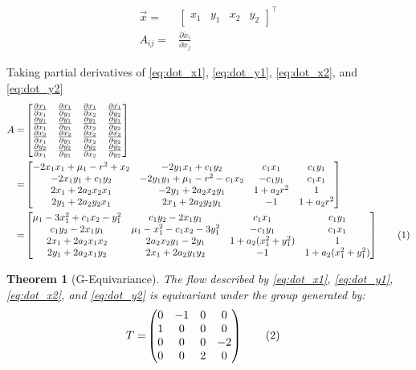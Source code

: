 \documentclass[]{article}
\newcommand\numberthis{\addtocounter{equation}{1}\tag{\theequation}}
\newtheorem{thm}{Theorem}
\begin{document}
\begin{align*}
	\vec{x}=& \begin{bmatrix}
		x_1&y_1&x_2&y_2
	\end{bmatrix}^\top\\
	A_{ij} =&\frac{\partial \dot{x}_i}{\partial x_j}
\end{align*}

Taking partial derivatives of \eqref{eq:dot_x1}, \eqref{eq:dot_y1}, \eqref{eq:dot_x2}, and \eqref{eq:dot_y2}
\begin{align*}
	A =& \begin{bmatrix}
		\frac{\partial \dot{x_1}}{\partial {x_1}}&\frac{\partial \dot{x_1}}{\partial {y_1}}&\frac{\partial \dot{x_1}}{\partial {x_2}}&\frac{\partial \dot{x_1}}{\partial {y_2}}\\
		\frac{\partial \dot{y_1}}{\partial {x_1}}&\frac{\partial \dot{y_1}}{\partial {y_1}}&\frac{\partial \dot{y_1}}{\partial {x_2}}&\frac{\partial \dot{y_1}}{\partial {y_2}}\\
		\frac{\partial \dot{x_2}}{\partial {x_1}}&\frac{\partial \dot{x_2}}{\partial {y_1}}&\frac{\partial \dot{x_2}}{\partial {x_2}}&\frac{\partial \dot{x_2}}{\partial {y_2}}\\
		\frac{\partial \dot{y_2}}{\partial {x_1}}&\frac{\partial \dot{y_2}}{\partial {y_1}}&\frac{\partial \dot{y_2}}{\partial {x_2}}&\frac{\partial \dot{y_2}}{\partial {y_2}}
	\end{bmatrix}\\
	=& \begin{bmatrix}
		-2x_1x_1 + \mu_1-r^2+x_2&-2y_1x_1+c_1y_2&c_1x_1&c_1y_1\\
		-2 x_1y_1 +c_1 y_2&-2y_1y_1+\mu_1-r^2-c_1x_2&-c_1y_1&c_1x_1\\
		2x_1+2a_2x_2x_1&-2y_1+2a_2x_2y_1&1+a_2r^2&1\\
		2y_1+2a_2 y_2 x_1&2x_1+2a_2y_2y_1&-1&1+a_2 r^2
	\end{bmatrix}\\
 =& \begin{bmatrix}
		\mu_1-3x_1^2+c_1x_2-y_1^2&c_1y_2-2x_1y_1&c_1x_1&c_1y_1\\
		c_1y_2-2x_1y_1&\mu_1-x_1^2-c_1x_2-3y_1^2&-c_1y_1&c_1x_1\\
		2x_1+2a_2x_1x_2&2a_2x_2y_1-2y_1&1+a_2(x_1^2+y_1^2)&1\\
		2y_1+2a_2x_1y_2&2x_1+2a_2y_1y_2&-1&1+a_2(x_1^2+ y_1^2)
	\end{bmatrix}\numberthis \label{eq:stability}
\end{align*}
\begin{thm}[G-Equivariance]
	The flow described by \eqref{eq:dot_x1}, \eqref{eq:dot_y1}, \eqref{eq:dot_x2}, and \eqref{eq:dot_y2} is equivariant under the group generated by:
	\begin{align*}
		T =& \begin{pmatrix}
			0&-1&0&0\\
			1&0&0&0\\
			0&0&0&-2\\
			0&0&2&0
		\end{pmatrix} \numberthis \label{eq:two_modes:generator}
	\end{align*}
\end{thm}
\end{document}
